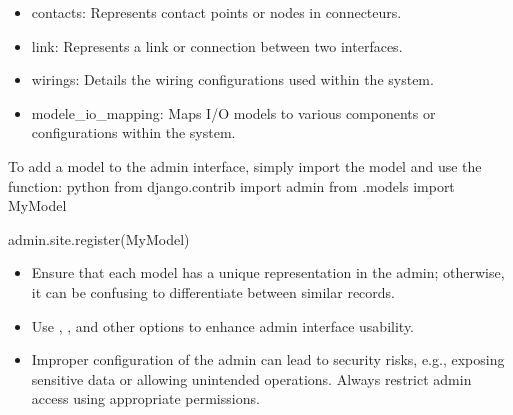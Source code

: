 \documentclass[letterpaper,10pt,english]{sphinxmanual}
\begin{document}
\begin{description}
\begin{itemize}
\item {} 
\sphinxAtStartPar
contacts: Represents contact points or nodes in connecteurs.

\item {} 
\sphinxAtStartPar
link: Represents a link or connection between two interfaces.

\item {} 
\sphinxAtStartPar
wirings: Details the wiring configurations used within the system.

\item {} 
\sphinxAtStartPar
modele\_io\_mapping: Maps I/O models to various components or configurations within the system.

\end{itemize}

\sphinxAtStartPar
To add a model to the admin interface, simply import the model and use the  function:
{\color{red}\bfseries{}\textasciigrave{}\textasciigrave{}}{\color{red}\bfseries{}\textasciigrave{}}python
from django.contrib import admin
from .models import MyModel

\sphinxAtStartPar
admin.site.register(MyModel)
{\color{red}\bfseries{}\textasciigrave{}\textasciigrave{}}{\color{red}\bfseries{}\textasciigrave{}}

\begin{itemize}
\item {} 
\sphinxAtStartPar
Ensure that each model has a unique representation in the admin; otherwise, it can be confusing to differentiate between similar records.

\item {} 
\sphinxAtStartPar
Use , , and other  options to enhance admin interface usability.

\end{itemize}

\begin{itemize}
\item {} 
\sphinxAtStartPar
Improper configuration of the admin can lead to security risks, e.g., exposing sensitive data or allowing unintended operations. Always restrict admin access using appropriate permissions.

\end{itemize}

\end{description}
\end{document}
